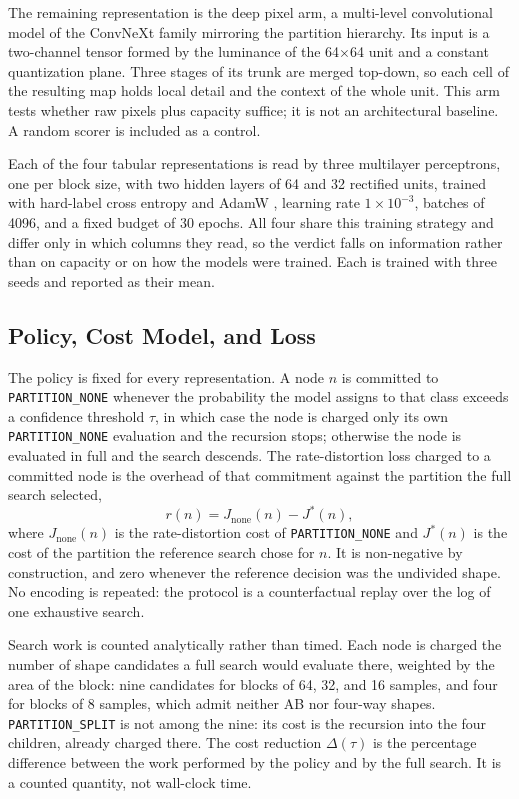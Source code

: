 \documentclass{article}
\begin{document}
The remaining representation is the deep pixel arm, a multi-level convolutional
model of the ConvNeXt family \cite{convnext} mirroring the partition hierarchy.
Its input is a two-channel tensor formed by the luminance of the 64$\times$64
unit and a constant quantization plane. Three stages of its trunk are merged
top-down, so each cell of the resulting map holds local detail and the context
of the whole unit. This arm tests whether raw pixels plus capacity suffice; it
is not an architectural baseline. A random scorer is included as a control.

Each of the four tabular representations is read by three multilayer
perceptrons, one per block size, with two hidden layers of 64 and 32 rectified
units, trained with hard-label cross entropy and AdamW \cite{adamw}, learning
rate $1 \times 10^{-3}$, batches of 4096, and a fixed budget of 30 epochs. All
four share this training strategy and differ only in which columns they read, so
the verdict falls on information rather than on capacity or on how the models
were trained. Each is trained with three seeds and reported as their mean.

\subsection{Policy, Cost Model, and Loss}
\label{ssec:policy}

The policy is fixed for every representation. A node $n$ is committed to
\texttt{PARTITION\_NONE} whenever the probability the model assigns to that class
exceeds a confidence threshold $\tau$, in which case the node is charged only its
own \texttt{PARTITION\_NONE} evaluation and the recursion stops; otherwise the
node is evaluated in full and the search descends. The rate-distortion loss
charged to a committed node is the overhead of that commitment against the
partition the full search selected,
\begin{equation}
r(n) = J_{\mathrm{none}}(n) - J^{*}(n),
\label{eq:regret}
\end{equation}
where $J_{\mathrm{none}}(n)$ is the rate-distortion cost of
\texttt{PARTITION\_NONE} and $J^{*}(n)$ is the cost of the partition the reference
search chose for $n$. It is non-negative by construction, and zero whenever the
reference decision was the undivided shape. No encoding is repeated: the
protocol is a counterfactual replay over the log of one exhaustive search.

Search work is counted analytically rather than timed. Each node is charged the
number of shape candidates a full search would evaluate there, weighted by the
area of the block: nine candidates for blocks of 64, 32, and 16 samples, and four
for blocks of 8 samples, which admit neither AB nor four-way shapes.
\texttt{PARTITION\_SPLIT} is not among the nine: its cost is the recursion into
the four children, already charged there. The cost reduction $\Delta(\tau)$ is
the percentage difference between the work performed by the policy and by the
full search. It is a counted quantity, not wall-clock time.
\end{document}

